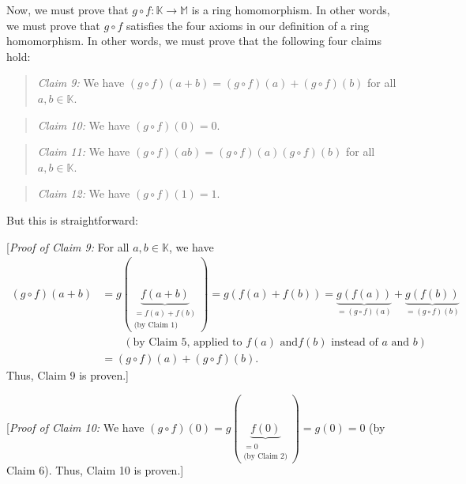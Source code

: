 \documentclass[paper=a4, fontsize=12pt]{scrartcl}%
\theoremstyle{plainsl}
\theoremstyle{definition}
\theoremstyle{remark}
\newenvironment{statement}{\begin{quote}}{\end{quote}}
\begin{document}
Now, we must prove that $g\circ f:\mathbb{K}\rightarrow\mathbb{M}$ is a ring
homomorphism. In other words, we must prove that $g\circ f$ satisfies the four
axioms in our definition of a ring homomorphism. In other words, we must prove
that the following four claims hold:

\begin{statement}
\textit{Claim 9:} We have $\left(  g\circ f\right)  \left(  a+b\right)
=\left(  g\circ f\right)  \left(  a\right)  +\left(  g\circ f\right)  \left(
b\right)  $ for all $a,b\in\mathbb{K}$.
\end{statement}

\begin{statement}
\textit{Claim 10:} We have $\left(  g\circ f\right)  \left(  0\right)  =0$.
\end{statement}

\begin{statement}
\textit{Claim 11:} We have $\left(  g\circ f\right)  \left(  ab\right)
=\left(  g\circ f\right)  \left(  a\right)  \left(  g\circ f\right)  \left(
b\right)  $ for all $a,b\in\mathbb{K}$.
\end{statement}

\begin{statement}
\textit{Claim 12:} We have $\left(  g\circ f\right)  \left(  1\right)  =1$.
\end{statement}

But this is straightforward:

[\textit{Proof of Claim 9:} For all $a,b\in\mathbb{K}$, we have%
\begin{align*}
\left(  g\circ f\right)  \left(  a+b\right)   &  =g\left(
\underbrace{f\left(  a+b\right)  }_{\substack{=f\left(  a\right)  +f\left(
b\right)  \\\text{(by Claim 1)}}}\right)  =g\left(  f\left(  a\right)
+f\left(  b\right)  \right)  =\underbrace{g\left(  f\left(  a\right)  \right)
}_{=\left(  g\circ f\right)  \left(  a\right)  }+\underbrace{g\left(  f\left(
b\right)  \right)  }_{=\left(  g\circ f\right)  \left(  b\right)  }\\
&  \qquad\left(  \text{by Claim 5, applied to }f\left(  a\right)  \text{ and
}f\left(  b\right)  \text{ instead of }a\text{ and }b\right) \\
&  =\left(  g\circ f\right)  \left(  a\right)  +\left(  g\circ f\right)
\left(  b\right)  .
\end{align*}
Thus, Claim 9 is proven.]

[\textit{Proof of Claim 10:} We have $\left(  g\circ f\right)  \left(
0\right)  =g\left(  \underbrace{f\left(  0\right)  }_{\substack{=0\\\text{(by
Claim 2)}}}\right)  =g\left(  0\right)  =0$ (by Claim 6). Thus, Claim 10 is proven.]
\end{document}
